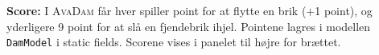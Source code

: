 
\textbf{Score:} I \textsc{AvaDam} får hver spiller point for at flytte en brik (+1 point), og yderligere 9 point for at slå en fjendebrik ihjel. Pointene lagres i modellen \texttt{DamModel} i static fields. Scorene vises i panelet til højre for brættet.\\


